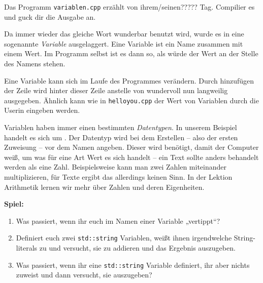 
Das Programm \texttt{variablen.cpp} erzählt von ihrem/seinen????? Tag.
Compilier es und guck dir die Ausgabe an.


Da immer wieder das gleiche Wort \glqq{}wunderbar\grqq{} benutzt wird, wurde es in eine sogenannte \emph{Variable} ausgelaggert.
Eine Variable ist ein Name zusammen mit einem Wert.
Im Programm selbst ist es dann so, als würde der Wert an der Stelle des Namens stehen.

Eine Variable kann sich im Laufe des Programmes verändern.
Durch hinzufügen der Zeile  wird hinter dieser Zeile anstelle von \glqq{}wundervoll\grqq{} nun \glqq{}langweilig\grqq{} ausgegeben.
Ähnlich kann wie in \texttt{helloyou.cpp} der Wert von Variablen durch  die Userin eingeben werden.

Variablen haben immer einen bestimmten \emph{Datentypen}.
In unserem Beispiel handelt es sich um .
Der Datentyp wird bei dem Erstellen -- also der ersten Zuweisung -- vor dem Namen angeben.
Dieser wird benötigt, damit der Computer weiß, um was für eine Art Wert es sich handelt -- ein Text sollte anders behandelt werden als eine Zahl.
Beispielsweise kann man zwei Zahlen miteinander multiplizieren, für Texte ergibt das allerdings keinen Sinn.
In der Lektion Arithmetik lernen wir mehr über Zahlen und deren Eigenheiten.

\textbf{Spiel:}
\begin{enumerate}
    \item Was passiert, wenn ihr euch im Namen einer Variable „vertippt“?
    \item Definiert euch zwei \texttt{std::string} Variablen, weißt ihnen
        irgendwelche String-literals zu und versucht, sie zu addieren und das Ergebnis auszugeben.
    \item Was passiert, wenn ihr eine \texttt{std::string} Variable definiert,
        ihr aber nichts zuweist und dann versucht, sie auszugeben?
\end{enumerate}
